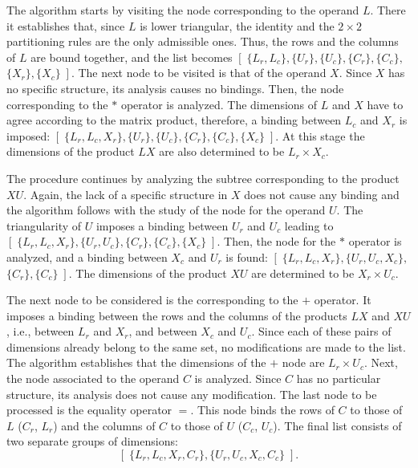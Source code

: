 \documentclass{llncs}
\begin{document}
The algorithm starts by visiting the node corresponding to the operand $L$.
There it establishes that, since $L$ is lower triangular,
the identity and the $2 \times 2$ partitioning rules are the only admissible
ones. Thus, the rows and the columns of $L$ are bound together, and the list becomes
$\left[ \; \{ L_{r}, L_{c}\}, \{ U_{r}\}, \{ U_{c}\}, \{ C_{r}\}, \{ C_{c}\},\right.$
$\left.\{ X_{r}\}, \{ X_{c}\} \; \right].$
\noindent
The next node to be visited is that of the operand $X$.
Since $X$ has no specific structure, its analysis causes no bindings.
Then, the node corresponding to the $\ast$ operator is analyzed.
The dimensions of $L$ and $X$ have to agree according to the matrix product, therefore,
a binding between $L_c$ and $X_r$ is imposed:
$\left[ \; \{ L_{r}, L_{c}, X_{r}\}, \{ U_{r}\}, \{ U_{c}\}, \{ C_{r}\}, \{ C_{c}\}, \{ X_{c}\} \; \right].$
\noindent
At this stage the dimensions of the product $L X$ are also determined to be
$L_{r} \times X_{c}$.

The procedure continues by analyzing the subtree corresponding to the product $X U$.
Again, the lack of a specific structure in $X$ does not cause any binding and the algorithm follows
with the study of the node for the operand $U$. The triangularity of $U$ imposes a binding between
$U_{r}$ and $U_{c}$ leading to 
$\left[ \; \{ L_{r}, L_{c}, X_{r}\}, \{ U_{r}, U_{c}\}, \{ C_{r}\}, \{ C_{c}\}, \{ X_{c}\} \; \right].$
\noindent
Then, the node for the $\ast$ operator is analyzed, and a binding between $X_c$ and $U_r$ is found:
$\left[ \; \{ L_{r}, L_{c}, X_{r}\}, \{ U_{r}, U_{c}, X_{c}\},\right.$ $\left.\{ C_{r}\}, \{ C_{c}\} \; \right].$
The dimensions of the product $X U$ are determined to be $X_{r} \times U_{c}$. 

The next node to be considered is the corresponding to the $+$ operator. It imposes a binding between
the rows and the columns of the products $L X$ and $X U$, i.e., between $L_{r}$ and $X_{r}$,
and between $X_{c}$ and $U_{c}$. Since each of these pairs of dimensions already belong to the same
set, no modifications are made to the list. The algorithm establishes that the dimensions of 
the $+$ node are $L_r \times U_c$. Next, the node associated to the operand $C$
is analyzed. Since $C$ has no particular structure, its analysis does not cause any
modification. The last node to be processed is the equality operator
$=$. This node binds the rows of $C$ to those of $L$ ($C_r$, $L_r$)
and the columns of $C$ to those of $U$ ($C_c$, $U_c$). The final list
consists of two separate groups of dimensions:
$$\left[ \; \{ L_{r}, L_{c}, X_{r}, C_{r}\}, \{ U_{r}, U_{c}, X_{c}, C_{c}\} \; \right].$$
\end{document}
